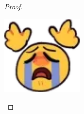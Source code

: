 \begin{proof}
\begin{parts}
\begin{center}
\includegraphics[width=0.3\textwidth]{gg.png}
\end{center}
	\end{parts}
\end{proof}

